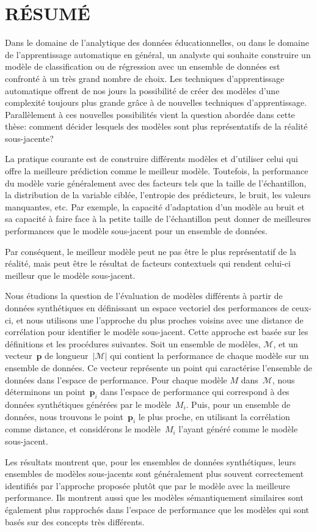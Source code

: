 \chapter*{RÉSUMÉ}\thispagestyle{headings}
Dans le domaine de l'analytique des données éducationnelles, ou dans le domaine de l'apprentissage automatique en général, un analyste qui souhaite construire un modèle de classification ou de régression avec un ensemble de données est confronté à un très grand nombre de choix. Les techniques d'apprentissage automatique offrent de nos jours la possibilité de créer des modèles d'une complexité toujours plus grande grâce à de nouvelles techniques d'apprentissage. Parallèlement à ces nouvelles possibilités vient la question abordée dans cette thèse: comment décider lesquels des modèles sont plus représentatifs de la réalité sous-jacente?

La pratique courante est de construire différents modèles et d'utiliser celui qui offre la meilleure prédiction comme le meilleur modèle. Toutefois, la performance du modèle varie généralement avec des facteurs tels que la taille de l'échantillon, la distribution de la variable ciblée, l'entropie des prédicteurs, le bruit, les valeurs manquantes, etc. Par exemple, la capacité d'adaptation d'un modèle au bruit et sa capacité à faire face à la petite taille de l'échantillon peut donner de meilleures performances que le modèle sous-jacent pour un ensemble de données.

Par conséquent, le meilleur modèle peut ne pas être le plus représentatif de la réalité, mais peut être le résultat de facteurs contextuels qui rendent celui-ci meilleur que le modèle sous-jacent.

Nous étudions la question de l'évaluation de modèles différents à partir de données synthétiques en définissant un espace vectoriel des performances de ceux-ci, et nous utilisons une l'approche du plus proches voisins avec une distance de corrélation pour identifier le modèle sous-jacent. Cette approche est basée sur les définitions et les procédures suivantes. Soit un ensemble de modèles, $\mathcal{M}$, et un vecteur~$\mathbf{p}$ de longueur~$|\mathcal{M}|$ qui contient la performance de chaque modèle sur un ensemble de données. Ce vecteur représente un point qui caractérise l'ensemble de données dans l'espace de performance. Pour chaque modèle $M$ dans~$\mathcal {M}$, nous déterminons un point~$\mathbf{p}_i$ dans l'espace de performance qui correspond à des données synthétiques générées par le modèle~$M_i$. Puis, pour un ensemble de données, nous trouvons le point~$\mathbf{p}_i$ le plus proche, en utilisant la corrélation comme distance, et considérons le modèle~$M_i$ l'ayant généré comme le modèle sous-jacent.

Les résultats montrent que, pour les ensembles de données synthétiques, leurs ensembles de modèles sous-jacents sont généralement plus souvent correctement identifiés par l'approche proposée plutôt que par le modèle avec la meilleure performance. Ils montrent aussi que les modèles sémantiquement similaires sont également plus rapprochés dans l'espace de performance que les modèles qui sont basés sur des concepts très différents.

